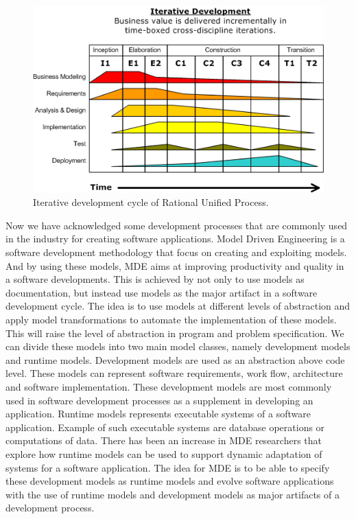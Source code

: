 \begin{figure}[H]
	\centering
	\includegraphics[scale=0.7]{./Figures/RUP.png}
	\caption[Rational Unified Process]
	{Iterative development cycle of Rational Unified Process.}
	\label{fig:RUP}
\end{figure}

Now we have acknowledged some development processes that are commonly used in
the industry for creating software applications. Model Driven Engineering is a
software development methodology that focus on creating and exploiting
models. And by using these models, MDE aims at improving productivity and
quality in a software developments\cite{France2007}. This is achieved by not only to use
models as documentation, but instead use models as the major artifact in a software
development cycle. The idea is to use models at different levels of abstraction
and apply model transformations to automate the implementation of these
models. This will raise the level of abstraction in program and problem
specification. We can divide these models into two main model classes, namely
development models and runtime models. Development models are used as an
abstraction above code level. These models can represent software
requirements, work flow, architecture and software implementation. These
development models are most commonly used in software development processes as a
supplement in developing an application. Runtime models represents executable
systems of a software application. Example of such executable systems are
database operations or computations of data. There has been an increase in MDE
researchers that explore how runtime models can be used to support dynamic
adaptation of systems for a software application\cite{France2007}. The idea for
MDE is to be able to specify these development models as runtime models and
evolve software applications with the use of runtime models and development
models as major artifacts of a development process. 
 
